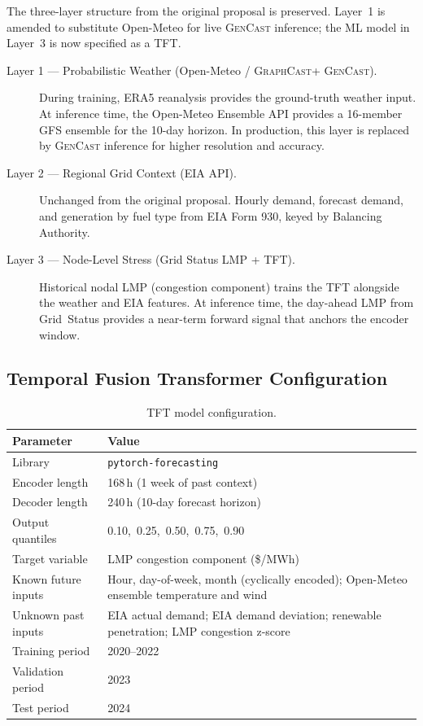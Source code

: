 \documentclass[10pt,letterpaper]{article}
\newcommand{\graphcast}{\textsc{GraphCast}\xspace}
\newcommand{\gencast}{\textsc{GenCast}\xspace}
\newcommand{\tft}{\textsc{TFT}\xspace}
\begin{document}
The three-layer structure from the original proposal is preserved. Layer~1 is amended
to substitute Open-Meteo for live \gencast inference; the ML model in Layer~3 is now
specified as a \tft.

\begin{description}
  \item[Layer 1 --- Probabilistic Weather (Open-Meteo / \graphcast + \gencast).]
        During training, ERA5 reanalysis provides the ground-truth weather input.
        At inference time, the Open-Meteo Ensemble API provides a 16-member GFS ensemble
        for the 10-day horizon. In production, this layer is replaced by \gencast
        inference for higher resolution and accuracy.

  \item[Layer 2 --- Regional Grid Context (EIA API).]
        Unchanged from the original proposal. Hourly demand, forecast demand, and
        generation by fuel type from EIA Form 930, keyed by Balancing Authority.

  \item[Layer 3 --- Node-Level Stress (Grid Status LMP + \tft).]
        Historical nodal LMP (congestion component) trains the \tft alongside the
        weather and EIA features. At inference time, the day-ahead LMP from Grid~Status
        provides a near-term forward signal that anchors the encoder window.
\end{description}

\subsection{Temporal Fusion Transformer Configuration}

\begin{table}[H]
\centering
\caption{\tft model configuration.}
\label{tab:tft}
\renewcommand{\arraystretch}{1.25}
\begin{tabular}{@{}lp{9cm}@{}}
\toprule
\textbf{Parameter} & \textbf{Value} \\
\midrule
Library             & \texttt{pytorch-forecasting} \\
Encoder length      & 168\,h (1 week of past context) \\
Decoder length      & 240\,h (10-day forecast horizon) \\
Output quantiles    & 0.10,\ 0.25,\ 0.50,\ 0.75,\ 0.90 \\
Target variable     & LMP congestion component (\$/MWh) \\
Known future inputs & Hour, day-of-week, month (cyclically encoded);
                      Open-Meteo ensemble temperature and wind \\
Unknown past inputs & EIA actual demand; EIA demand deviation;
                      renewable penetration; LMP congestion z-score \\
Training period     & 2020--2022 \\
Validation period   & 2023 \\
Test period         & 2024 \\
\bottomrule
\end{tabular}
\end{table}
\end{document}
